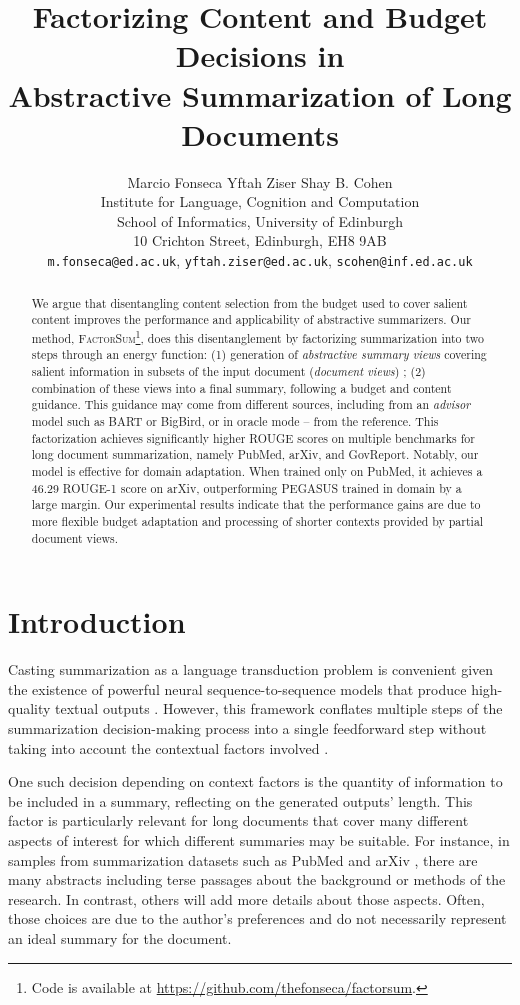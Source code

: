 \documentclass[11pt,table]{article}
\title{Factorizing Content and Budget Decisions in \\ Abstractive Summarization of Long Documents}
\author{Marcio Fonseca  Yftah Ziser  Shay B. Cohen \\
Institute for Language, Cognition and Computation \\
School of Informatics, University of Edinburgh \\
10 Crichton Street, Edinburgh, EH8 9AB \\
\medskip
\texttt{m.fonseca@ed.ac.uk},
\texttt{yftah.ziser@ed.ac.uk},
\texttt{scohen@inf.ed.ac.uk}}
\newcommand{\modelname}{FactorSum}
\begin{document}
\maketitle
\begin{abstract}
We argue that disentangling content selection from the budget used to cover salient content improves the performance and applicability of abstractive summarizers. Our method, \textsc{\modelname}\footnote{Code is available at \url{https://github.com/thefonseca/factorsum}.}, does this disentanglement by factorizing summarization into two steps through
an energy function: (1) generation of \emph{abstractive summary views} covering salient information in subsets of the input document (\emph{document views})
; (2) combination of these views into a final summary, following a budget and content guidance. This guidance may come from different sources, including from an \emph{advisor} model such as BART or BigBird, or in oracle mode -- from the reference. This factorization achieves significantly higher ROUGE scores on multiple benchmarks for long document summarization, namely PubMed, arXiv, and GovReport. Notably, our model is effective for domain adaptation. When trained only on PubMed, it achieves a 46.29 ROUGE-1 score on arXiv, outperforming PEGASUS trained in domain by a large margin. Our experimental results indicate that the performance gains are due to more flexible budget adaptation and processing of shorter contexts provided by partial document views.
\end{abstract}

\section{Introduction}

Casting summarization as a language transduction problem is convenient given the existence of powerful neural sequence-to-sequence models that produce high-quality textual outputs \citep{zhang2020pegasus,lewis2019bart}. However, this framework conflates multiple steps of the summarization decision-making process into a single feedforward step without taking into account the contextual factors involved \citep{jones1999automatic}.

One such decision depending on context factors is the quantity of information to be included in a summary, reflecting on the generated outputs' length. This factor is particularly relevant for long documents that cover many different aspects of interest for which different summaries may be suitable. For instance, in samples from summarization datasets such as PubMed and arXiv \citep{cohan2018discourse}, there are many abstracts including terse passages about the background or methods of the research. In contrast, others will add more details about those aspects. Often, those choices are due to the author's preferences and do not necessarily represent an ideal summary for the document.
\end{document}
